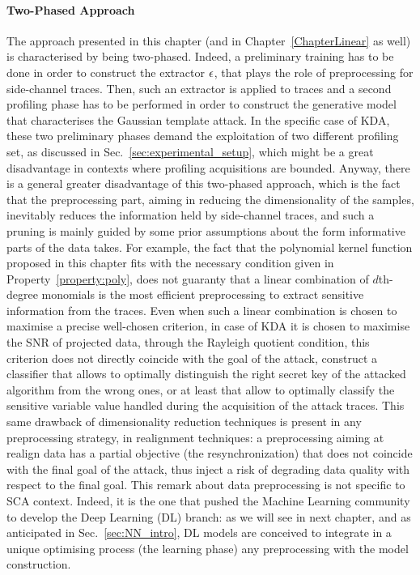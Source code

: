 \paragraph*{Two-Phased Approach}
The approach presented in this chapter (and in Chapter~\ref{ChapterLinear} as well) is characterised by being two-phased. Indeed, a preliminary training has to be done in order to construct the extractor $\epsilon$, that plays the role of preprocessing for side-channel traces. Then, such an extractor is applied to traces and a second profiling phase has to be performed in order to construct the generative model that characterises the Gaussian template attack. In the specific case of KDA, these two preliminary phases demand the exploitation of two different profiling set, as discussed in Sec.~\ref{sec:experimental_setup}, which might be a great disadvantage in contexts where profiling acquisitions are bounded. Anyway, there is a general greater disadvantage of this two-phased approach, which is the fact that the preprocessing part, aiming in reducing the dimensionality of the samples, inevitably reduces the information held by side-channel traces, and such a pruning is mainly guided by some prior assumptions about the form informative parts of the data takes. For example, the fact that the polynomial kernel function proposed in this chapter fits with the necessary condition given in Property~\ref{property:poly}, does not guaranty that a linear combination of $d$th-degree monomials is the most efficient preprocessing to extract sensitive information from the traces. Even when such a linear combination is chosen to maximise a precise well-chosen criterion, in case of KDA it is chosen to maximise the SNR of projected data, through the Rayleigh quotient condition, this criterion does not directly coincide with the goal of the attack, \ie construct a classifier that allows to optimally distinguish the right secret key of the attacked algorithm from the wrong ones, or at least that allow to optimally classify the sensitive variable value handled during the acquisition of the attack traces. This same drawback of dimensionality reduction techniques is present in any preprocessing strategy, \eg in realignment techniques: a preprocessing aiming at realign data has a partial objective (the resynchronization) that does not coincide with the final goal of the attack, thus inject a risk of degrading data quality with respect to the final goal. This remark about data preprocessing is not specific to SCA context. Indeed, it is the one that pushed the Machine Learning community to develop the Deep Learning (DL) branch: as we will see in next chapter, and as anticipated in Sec.~\ref{sec:NN_intro}, DL models are conceived to integrate in a unique optimising process (the learning phase) any preprocessing with the model construction. 
